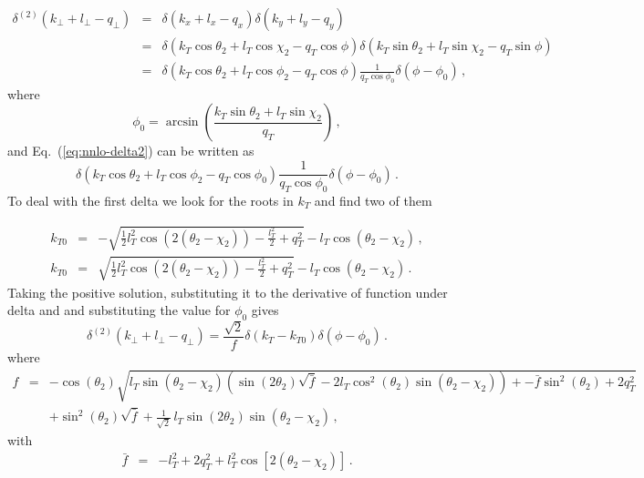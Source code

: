 \documentclass[a4paper,11pt]{report}
\numberwithin{equation}{section}
\begin{document}
\begin{eqnarray}
  \delta^{(2)}(k_\perp+l_\perp-q_\perp) 
  & = & \delta(k_x+l_x-q_x)\delta(k_y+l_y-q_y)  \nonumber \\
  & = & \delta(k_T \cos\theta_2+l_T \cos\chi_2-q_T \cos\phi)
         \delta(k_T \sin\theta_2+l_T \sin\chi_2-q_T \sin\phi) \nonumber \\
  & = & \delta(k_T \cos\theta_2+l_T\cos\phi_2-q_T \cos\phi)
        \frac{1}{q_T\cos\phi_0} \delta(\phi-\phi_0)\,,
  \label{eq:nnlo-delta2}	 
\end{eqnarray}
%
where
%
\begin{equation}
  \phi_0 = \arcsin\left(\frac{k_T\sin\theta_2+l_T\sin\chi_2}{q_T}\right)\,,
\end{equation}
%
and Eq.~(\ref{eq:nnlo-delta2}) can be written as
%
\begin{equation}
  \delta(k_T \cos\theta_2+l_T\cos\phi_2-q_T \cos\phi_0)
  \frac{1}{q_T\cos\phi_0} \delta(\phi-\phi_0)\,.
\end{equation}
%
To deal with the first delta we look for the roots in $k_T$ and find two of them

\begin{eqnarray}
k_{T0} & = & 
  -\sqrt{\frac{1}{2} l_T^2 \cos \left(2
  \left(\theta _2-\chi
  _2\right)\right)-\frac{l_T^2}{2}+q_T^2}-l_T
   \cos \left(\theta _2-\chi _2\right)\,,
\\
%
k_{T0} & = & 
   \sqrt{\frac{1}{2} l_T^2 \cos \left(2 \left(\theta _2-\chi
   _2\right)\right)-\frac{l_T^2}{2}+q_T^2}-l_T \cos
   \left(\theta _2-\chi _2\right)\,.
\end{eqnarray}
%
Taking the positive solution, substituting it to the derivative of function
under delta and and substituting the value for $\phi_0$ gives
%
\begin{equation}
  \delta^{(2)}(k_\perp+l_\perp-q_\perp)  =
  \frac{\sqrt{2}}{f}\delta(k_T-k_{T0})\delta(\phi-\phi_0)\,.
\end{equation}
where 
%
\begin{eqnarray}
f & =  &
-\cos \left(\theta _2\right) 
\sqrt{l_T
\sin \left(\theta _2-\chi _2\right) \left(\sin \left(2 \theta _2\right) 
\sqrt{\bar f}-2 l_T \cos ^2\left(\theta
      _2\right) \sin \left(\theta _2-
      \chi _2\right)\right)+
      -\bar f \sin ^2\left(\theta_2\right)  +
      2 q_T^2}
\nonumber \\
& &
+ \sin ^2\left(\theta _2\right) \sqrt{\bar f}
+ \frac{1}{\sqrt{2}}\, l_T\sin \left(2 \theta _2\right)
\sin \left(\theta_2-\chi _2\right)\,,
\end{eqnarray}
%
with
%
\begin{eqnarray}
\bar f & = &
-l_T^2 + 2q_T^2 + l_T^2\cos\left[2(\theta_2-\chi_2)\right]\,.
\end{eqnarray}
\end{document}
